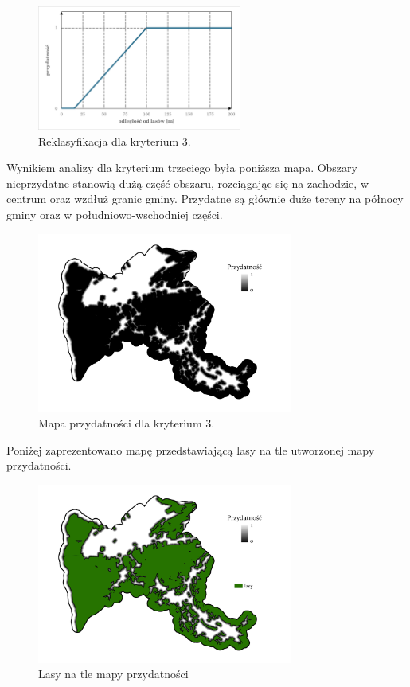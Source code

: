 \documentclass{article}
\begin{document}
\begin{figure}[H]
    \centering
    \includegraphics[width=0.6\textwidth]{img/kryterium3-wykres-glowny.png}
    \caption{Reklasyfikacja dla kryterium 3.}
\end{figure}
\vspace{10pt}
Wynikiem analizy dla kryterium trzeciego była poniższa mapa.
Obszary nieprzydatne stanowią dużą część obszaru, rozciągając się na zachodzie, w centrum oraz wzdłuż granic gminy. Przydatne są głównie duże tereny na północy gminy oraz w południowo-wschodniej części.

\vspace{5pt}

\begin{figure}[H]
    \centering
    \includegraphics[width=0.75\textwidth]{img/kryterium3-layout.jpg}
    \caption{Mapa przydatności dla kryterium 3.}
\end{figure}
\vspace{10pt}

Poniżej zaprezentowano mapę przedstawiającą lasy na tle utworzonej mapy przydatności. 

\begin{figure}[H]
    \centering
    \includegraphics[width=0.75\textwidth]{img/kryterium3-lasy.jpg}
    \caption{Lasy na tle mapy przydatności}
\end{figure}
\vspace{10pt}
\end{document}
